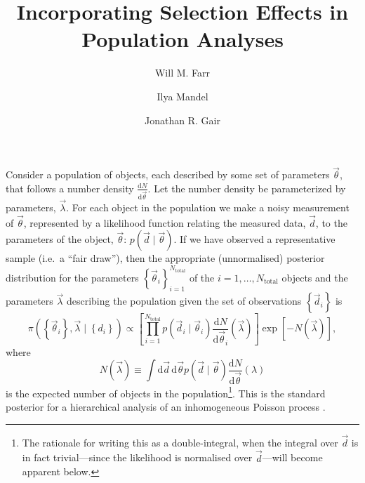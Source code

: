 \documentclass[modern]{aastex62}
\newcommand{\dd}{\mathrm{d}}
\newcommand{\diff}[2]{\frac{\dd #1}{\dd #2}}
\newcommand{\Ntotal}{N_\mathrm{total}}
\newcommand{\vd}{\vec{d}}
\newcommand{\vlambda}{\vec{\lambda}}
\newcommand{\vtheta}{\vec{\theta}}
\begin{document}
\title{Incorporating Selection Effects in Population Analyses}

\author[0000-0003-1540-8562]{Will M. Farr}

\author[0000-0002-6134-8946]{Ilya Mandel}

\author{Jonathan R. Gair}

\section*{}

Consider a population of objects, each described by some set of parameters
$\vtheta$, that follows a number density $\diff{N}{\vtheta}$.  Let the number
density be parameterized by parameters, $\vlambda$.  For each object in the
population we make a noisy measurement of $\vtheta$, represented by a likelihood
function relating the measured data, $\vd$, to the parameters of the object,
$\vtheta$: $p\left( \vd \mid \vtheta \right)$.  If we have observed a
representative sample (i.e.\ a ``fair draw''), then the appropriate
(unnormalised) posterior distribution for the parameters $\left\{ \vtheta_i
\right\}_{i=1}^{\Ntotal}$ of the $i = 1, \ldots, \Ntotal$ objects and the
parameters $\vlambda$ describing the population given the set of observations
$\left\{ \vd_i \right\}$ is
%
\begin{equation}
  \pi\left(\left\{ \vtheta_i \right\}, \vlambda \mid \left\{ d_i \right\}\right) \propto \left[ \prod_{i=1}^{\Ntotal} p\left( \vd_i \mid \vtheta_i \right) \diff{N}{\vtheta_i}\left( \vlambda \right) \right] \exp\left[ - N\left( \vlambda \right) \right],
\end{equation}
%
where
%
\begin{equation}
N\left( \vlambda \right) \equiv \int \dd \vd \, \dd \vtheta p\left( \vd \mid \vtheta \right) \diff{N}{\vtheta}\left( \lambda \right)
\end{equation}
%
is the expected number of objects in the population\footnote{The rationale for
writing this as a double-integral, when the integral over $\vd$ is in fact
trivial---since the likelihood is normalised over $\vd$---will become apparent
below.}.  This is the standard posterior for a hierarchical analysis of an
inhomogeneous Poisson process
\citep{Loredo1995,Hogg2010,Mandel2010,Youdin2011,Foreman-Mackey2014,Farr2015,Barrett2018}.
\end{document}
